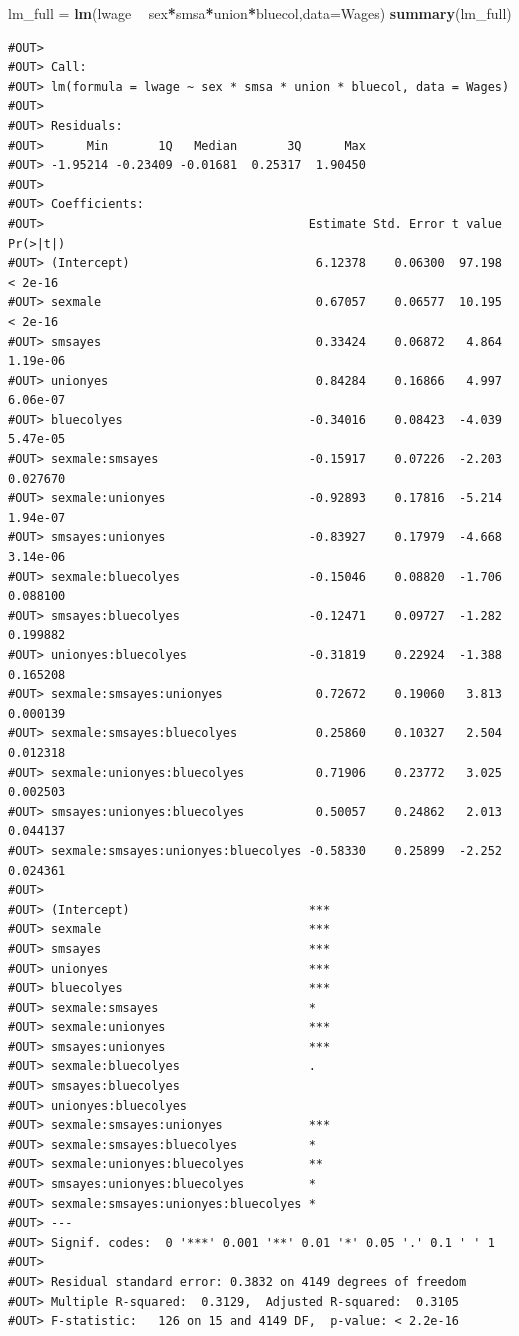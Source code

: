 \documentclass[]{book}
\newenvironment{Shaded}{\begin{snugshade}}{\end{snugshade}}
\newcommand{\KeywordTok}[1]{\textcolor[rgb]{0.13,0.29,0.53}{\textbf{#1}}}
\newcommand{\DataTypeTok}[1]{\textcolor[rgb]{0.13,0.29,0.53}{#1}}
\newcommand{\StringTok}[1]{\textcolor[rgb]{0.31,0.60,0.02}{#1}}
\newcommand{\OperatorTok}[1]{\textcolor[rgb]{0.81,0.36,0.00}{\textbf{#1}}}
\newcommand{\NormalTok}[1]{#1}
\theoremstyle{definition}
\theoremstyle{definition}
\theoremstyle{definition}
\theoremstyle{remark}
\begin{document}
\begin{Shaded}
\begin{Highlighting}[]
\NormalTok{lm_full =}\StringTok{ }\KeywordTok{lm}\NormalTok{(lwage }\OperatorTok{~}\StringTok{ }\NormalTok{sex}\OperatorTok{*}\NormalTok{smsa}\OperatorTok{*}\NormalTok{union}\OperatorTok{*}\NormalTok{bluecol,}\DataTypeTok{data=}\NormalTok{Wages)}
\KeywordTok{summary}\NormalTok{(lm_full)}
\end{Highlighting}
\end{Shaded}

\begin{verbatim}
#OUT> 
#OUT> Call:
#OUT> lm(formula = lwage ~ sex * smsa * union * bluecol, data = Wages)
#OUT> 
#OUT> Residuals:
#OUT>      Min       1Q   Median       3Q      Max 
#OUT> -1.95214 -0.23409 -0.01681  0.25317  1.90450 
#OUT> 
#OUT> Coefficients:
#OUT>                                     Estimate Std. Error t value Pr(>|t|)
#OUT> (Intercept)                          6.12378    0.06300  97.198  < 2e-16
#OUT> sexmale                              0.67057    0.06577  10.195  < 2e-16
#OUT> smsayes                              0.33424    0.06872   4.864 1.19e-06
#OUT> unionyes                             0.84284    0.16866   4.997 6.06e-07
#OUT> bluecolyes                          -0.34016    0.08423  -4.039 5.47e-05
#OUT> sexmale:smsayes                     -0.15917    0.07226  -2.203 0.027670
#OUT> sexmale:unionyes                    -0.92893    0.17816  -5.214 1.94e-07
#OUT> smsayes:unionyes                    -0.83927    0.17979  -4.668 3.14e-06
#OUT> sexmale:bluecolyes                  -0.15046    0.08820  -1.706 0.088100
#OUT> smsayes:bluecolyes                  -0.12471    0.09727  -1.282 0.199882
#OUT> unionyes:bluecolyes                 -0.31819    0.22924  -1.388 0.165208
#OUT> sexmale:smsayes:unionyes             0.72672    0.19060   3.813 0.000139
#OUT> sexmale:smsayes:bluecolyes           0.25860    0.10327   2.504 0.012318
#OUT> sexmale:unionyes:bluecolyes          0.71906    0.23772   3.025 0.002503
#OUT> smsayes:unionyes:bluecolyes          0.50057    0.24862   2.013 0.044137
#OUT> sexmale:smsayes:unionyes:bluecolyes -0.58330    0.25899  -2.252 0.024361
#OUT>                                        
#OUT> (Intercept)                         ***
#OUT> sexmale                             ***
#OUT> smsayes                             ***
#OUT> unionyes                            ***
#OUT> bluecolyes                          ***
#OUT> sexmale:smsayes                     *  
#OUT> sexmale:unionyes                    ***
#OUT> smsayes:unionyes                    ***
#OUT> sexmale:bluecolyes                  .  
#OUT> smsayes:bluecolyes                     
#OUT> unionyes:bluecolyes                    
#OUT> sexmale:smsayes:unionyes            ***
#OUT> sexmale:smsayes:bluecolyes          *  
#OUT> sexmale:unionyes:bluecolyes         ** 
#OUT> smsayes:unionyes:bluecolyes         *  
#OUT> sexmale:smsayes:unionyes:bluecolyes *  
#OUT> ---
#OUT> Signif. codes:  0 '***' 0.001 '**' 0.01 '*' 0.05 '.' 0.1 ' ' 1
#OUT> 
#OUT> Residual standard error: 0.3832 on 4149 degrees of freedom
#OUT> Multiple R-squared:  0.3129,  Adjusted R-squared:  0.3105 
#OUT> F-statistic:   126 on 15 and 4149 DF,  p-value: < 2.2e-16
\end{verbatim}
\end{document}
